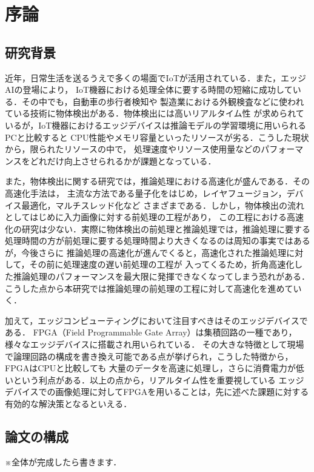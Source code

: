 \documentclass[11pt,a4j]{jreport}
\begin{document}
\chapter{序論} %

\section{研究背景}

近年，日常生活を送るうえで多くの場面でIoTが活用されている．また，エッジAIの登場により，
IoT機器における処理全体に要する時間の短縮に成功している．その中でも，自動車の歩行者検知や
製造業における外観検査などに使われている技術に物体検出がある．物体検出には高いリアルタイム性
が求められているが，IoT機器におけるエッジデバイスは推論モデルの学習環境に用いられるPCと比較すると
CPU性能やメモリ容量といったリソースが劣る．こうした現状から，限られたリソースの中で，
処理速度やリソース使用量などのパフォーマンスをどれだけ向上させられるかが課題となっている．

また，物体検出に関する研究では，推論処理における高速化が盛んである．その高速化手法\cite{AccelTemp}は，
主流な方法である量子化をはじめ，レイヤフュージョン，デバイス最適化，マルチスレッド化など
さまざまである．しかし，物体検出の流れとしてはじめに入力画像に対する前処理の工程があり，
この工程における高速化の研究は少ない．実際に物体検出の前処理と推論処理では，推論処理に要する
処理時間の方が前処理に要する処理時間より大きくなるのは周知の事実ではあるが，今後さらに
推論処理の高速化が進んでくると，高速化された推論処理に対して，その前に処理速度の遅い前処理の工程が
入ってくるため，折角高速化した推論処理のパフォーマンスを最大限に発揮できなくなってしまう恐れがある．
こうした点から本研究では推論処理の前処理の工程に対して高速化を進めていく．

加えて，エッジコンピューティングにおいて注目すべきはそのエッジデバイスである．
FPGA（Field Programmable Gate Array）は集積回路の一種であり，様々なエッジデバイスに搭載され用いられている．
その大きな特徴として現場で論理回路の構成を書き換え可能である点が挙げられ，こうした特徴から，FPGAはCPUと比較しても
大量のデータを高速に処理し，さらに消費電力が低いという利点がある．以上の点から，リアルタイム性を重要視している
エッジデバイスでの画像処理に対してFPGAを用いることは，先に述べた課題に対する有効的な解決策となるといえる．


\section{論文の構成}
※全体が完成したら書きます．
%
\end{document}
